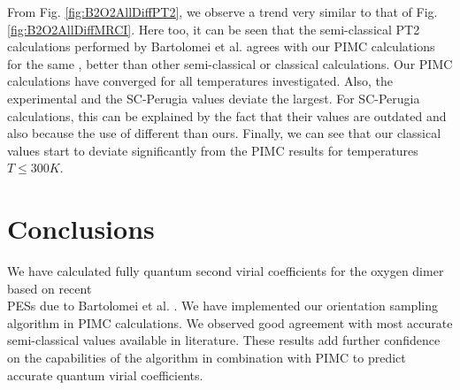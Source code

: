     From Fig. \ref{fig:B2O2AllDiffPT2}, we observe a trend very similar to that of Fig. \ref{fig:B2O2AllDiffMRCI}. Here too, it can be seen that the semi-classical PT2 calculations performed by Bartolomei et al. \cite{Bartolomei2010} agrees with our PIMC calculations for the same \PESs{}, better than other semi-classical or classical calculations. Our PIMC calculations have converged for all temperatures investigated. Also, the experimental and the SC-Perugia values deviate the largest. For SC-Perugia calculations, this can be explained by the fact that their values are outdated and also because the use of different \PESs{} than ours. Finally, we can see that our classical values start to deviate significantly from the PIMC results for temperatures $T \le 300K$.

    \section{Conclusions}
        We have calculated fully quantum second virial coefficients for the oxygen dimer based on recent \abinitio{} \\PESs{} due to Bartolomei et al. \cite{Bartolomei2010}. We have implemented our orientation sampling algorithm in PIMC calculations. We observed good agreement with most accurate semi-classical values available in literature. These results add further confidence on the capabilities of the algorithm in combination with PIMC to predict accurate quantum virial coefficients.
